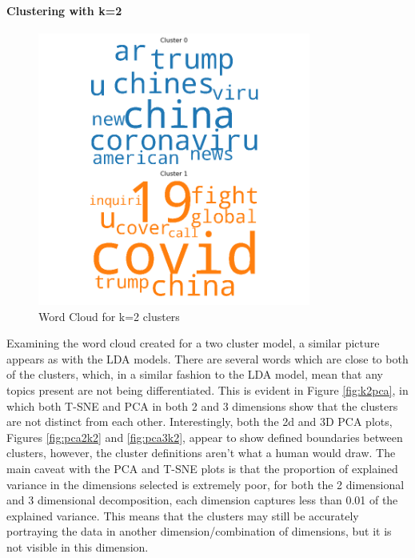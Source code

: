 \paragraph{Clustering with k=2}
\begin{figure}[H]
	\centering
	\includegraphics[width=0.8\textwidth]{images/kmeans_word_cloud_k=2.png}
	\caption{Word Cloud for k=2 clusters}
	\label{fig:wck2}
\end{figure}
Examining the word cloud created for a two cluster model, a similar picture appears as with the LDA models. There are several words which are close to both of the clusters, which, in a similar fashion to the LDA model, mean that any topics present are not being differentiated. This is evident in Figure \ref{fig:k2pca}, in which both T-SNE and PCA in both 2 and 3 dimensions show that the clusters are not distinct from each other. Interestingly, both the 2d and 3D PCA plots, Figures \ref{fig:pca2k2} and \ref{fig:pca3k2}, appear to show defined boundaries between clusters, however, the cluster definitions aren't what a human would draw. The main caveat with the PCA and T-SNE plots is that the proportion of explained variance in the dimensions selected is extremely poor, for both the 2 dimensional and 3 dimensional decomposition, each dimension captures less than 0.01 of the explained variance. This means that the clusters may still be accurately portraying the data in another dimension/combination of dimensions, but it is not visible in this dimension. 

